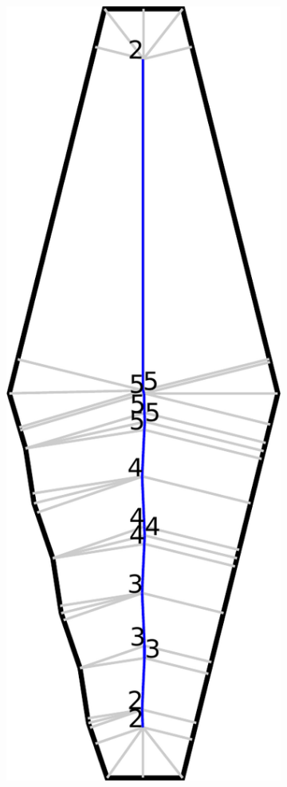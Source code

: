 \begin{figure}
\centering
\setlength{\figwidth}{0.13\textwidth}
\begin{subfigure}{\figwidth}
\includegraphics[width=\columnwidth]{sources-method-beading-transitioning-filtering--bead-count.pdf}

\end{subfigure}
\end{figure}
